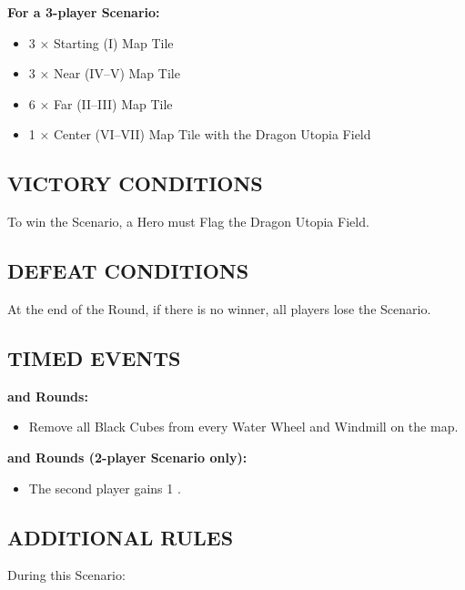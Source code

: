 \begin{multicols*}{2}
\textbf{For a 3-player Scenario:}
\begin{itemize}
  \item 3 × Starting (I) Map Tile
  \item 3 × Near (IV--V) Map Tile
  \item 6 × Far (II--III) Map Tile
  \item 1 × Center (VI--VII) Map Tile with the Dragon Utopia Field
\end{itemize}

\subsection*{\MakeUppercase{Victory Conditions}}
To win the Scenario, a Hero must Flag the Dragon Utopia Field.

\subsection*{\MakeUppercase{Defeat Conditions}}
At the end of the  Round, if there is no winner, all players lose the Scenario.

\subsection*{\MakeUppercase{Timed Events}}

\textbf{ and  Rounds:}
\begin{itemize}
  \item Remove all Black Cubes from every Water Wheel and Windmill on the map.
\end{itemize}

\textbf{ and  Rounds (2-player Scenario only):}
\begin{itemize}
  \item The second player gains 1 .
\end{itemize}

\subsection*{\MakeUppercase{Additional Rules}}

During this Scenario:


\end{multicols*}

